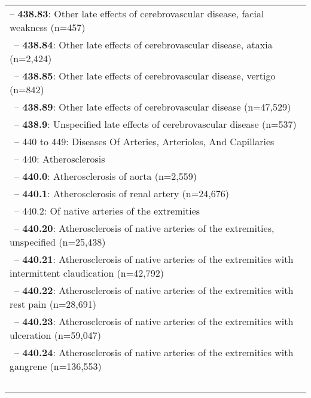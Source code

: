 \begin{longtable}{p{\textwidth}}
\hspace{40pt}\footnotesize{-- {\color{ForestGreen} \textbf{438.83}}: Other late effects of cerebrovascular disease, facial weakness (n=457)} \\ \-\ \hspace{40pt}\footnotesize{-- {\color{ForestGreen} \textbf{438.84}}: Other late effects of cerebrovascular disease, ataxia (n=2,424)} \\ \-\ \hspace{40pt}\footnotesize{-- {\color{ForestGreen} \textbf{438.85}}: Other late effects of cerebrovascular disease, vertigo (n=842)} \\ \-\ \hspace{40pt}\footnotesize{-- {\color{ForestGreen} \textbf{438.89}}: Other late effects of cerebrovascular disease (n=47,529)} \\ \-\ \hspace{30pt}\footnotesize{-- {\color{ForestGreen} \textbf{438.9}}: Unspecified late effects of cerebrovascular disease (n=537)} \\ \-\ \hspace{10pt}\footnotesize{-- 440 to 449: Diseases Of Arteries, Arterioles, And Capillaries} \\ \-\ \hspace{20pt}\footnotesize{-- 440: Atherosclerosis} \\ \-\ \hspace{30pt}\footnotesize{-- {\color{ForestGreen} \textbf{440.0}}: Atherosclerosis of aorta (n=2,559)} \\ \-\ \hspace{30pt}\footnotesize{-- {\color{ForestGreen} \textbf{440.1}}: Atherosclerosis of renal artery (n=24,676)} \\ \-\ \hspace{30pt}\footnotesize{-- 440.2: Of native arteries of the extremities} \\ \-\ \hspace{40pt}\footnotesize{-- {\color{ForestGreen} \textbf{440.20}}: Atherosclerosis of native arteries of the extremities, unspecified (n=25,438)} \\ \-\ \hspace{40pt}\footnotesize{-- {\color{ForestGreen} \textbf{440.21}}: Atherosclerosis of native arteries of the extremities with intermittent claudication (n=42,792)} \\ \-\ \hspace{40pt}\footnotesize{-- {\color{ForestGreen} \textbf{440.22}}: Atherosclerosis of native arteries of the extremities with rest pain (n=28,691)} \\ \-\ \hspace{40pt}\footnotesize{-- {\color{ForestGreen} \textbf{440.23}}: Atherosclerosis of native arteries of the extremities with ulceration (n=59,047)} \\ \-\ \hspace{40pt}\footnotesize{-- {\color{ForestGreen} \textbf{440.24}}: Atherosclerosis of native arteries of the extremities with gangrene (n=136,553)} \\ \-\ \hspace{40pt}\footnotesize{-- {\color{ForestGreen} 
\end{longtable}

